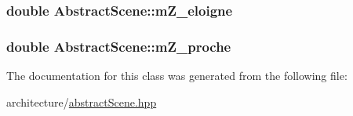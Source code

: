 \subsubsection[{\texorpdfstring{m\+Z\+\_\+eloigne}{mZ_eloigne}}]{\setlength{\rightskip}{0pt plus 5cm}double Abstract\+Scene\+::m\+Z\+\_\+eloigne\hspace{0.3cm}{\ttfamily [protected]}}\hypertarget{class_abstract_scene_aef1c839431dde4df2ffd2567abf6c927}{}\label{class_abstract_scene_aef1c839431dde4df2ffd2567abf6c927}
\subsubsection[{\texorpdfstring{m\+Z\+\_\+proche}{mZ_proche}}]{\setlength{\rightskip}{0pt plus 5cm}double Abstract\+Scene\+::m\+Z\+\_\+proche\hspace{0.3cm}{\ttfamily [protected]}}\hypertarget{class_abstract_scene_ab6ecf1a8af6498332c6ef0e972ea134f}{}\label{class_abstract_scene_ab6ecf1a8af6498332c6ef0e972ea134f}


The documentation for this class was generated from the following file\+:\begin{DoxyCompactItemize}
\item 
architecture/\hyperlink{abstract_scene_8hpp}{abstract\+Scene.\+hpp}\end{DoxyCompactItemize}
